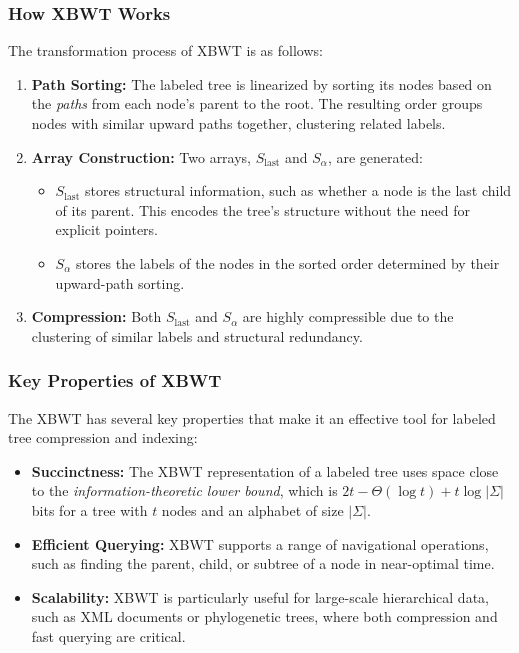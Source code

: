 \subsubsection{How XBWT Works}
The transformation process of XBWT is as follows:
\begin{enumerate}
    \item \textbf{Path Sorting:} The labeled tree is linearized by sorting its nodes based on the \emph{paths} from each node's parent to the root. The resulting order groups nodes with similar upward paths together, clustering related labels.
    \item \textbf{Array Construction:} Two arrays, \( S_{\text{last}} \) and \( S_{\alpha} \), are generated:
    \begin{itemize}
        \item \( S_{\text{last}} \) stores structural information, such as whether a node is the last child of its parent. This encodes the tree’s structure without the need for explicit pointers.
        \item \( S_{\alpha} \) stores the labels of the nodes in the sorted order determined by their upward-path sorting.
    \end{itemize}
    \item \textbf{Compression:} Both \( S_{\text{last}} \) and \( S_{\alpha} \) are highly compressible due to the clustering of similar labels and structural redundancy.
\end{enumerate}

\subsubsection{Key Properties of XBWT}
The XBWT has several key properties that make it an effective tool for labeled tree compression and indexing:
\begin{itemize}
    \item \textbf{Succinctness:} The XBWT representation of a labeled tree uses space close to the \emph{information-theoretic lower bound}, which is \( 2t - \Theta(\log t) + t \log |\Sigma| \) bits for a tree with $t$ nodes and an alphabet of size $|\Sigma|$.
    \item \textbf{Efficient Querying:} XBWT supports a range of navigational operations, such as finding the parent, child, or subtree of a node in near-optimal time.
    \item \textbf{Scalability:} XBWT is particularly useful for large-scale hierarchical data, such as XML documents or phylogenetic trees, where both compression and fast querying are critical.
\end{itemize}

